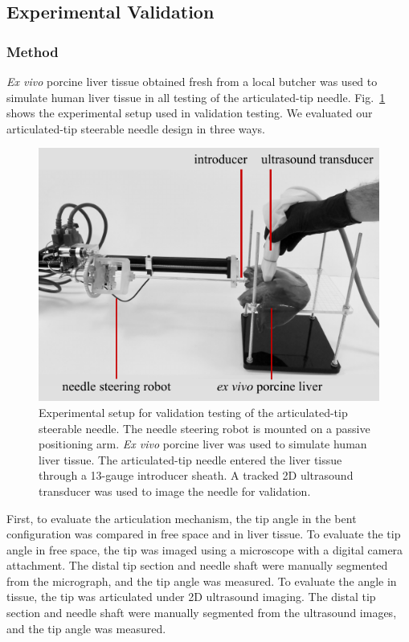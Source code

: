 \subsection{Experimental Validation}

\subsubsection{Method}
\textit{Ex vivo} porcine liver tissue obtained fresh from a local butcher was used to simulate human liver tissue in all testing of the articulated-tip needle. Fig.~\ref{fig:ExperimentalSetup} shows the experimental setup used in validation testing. We evaluated our articulated-tip steerable needle design in three ways. 

\begin{figure}[!t]
\centering
\includegraphics[width=0.75\columnwidth]{Images/Chapter3/ExperimentalSetup/ExperimentalSetup}
\caption[Setup for validation testing of the articulated-tip needle]{Experimental setup for validation testing of the articulated-tip steerable needle. The needle steering robot is mounted on a passive positioning arm. \textit{Ex vivo} porcine liver was used to simulate human liver tissue. The articulated-tip needle entered the liver tissue through a 13-gauge introducer sheath. A tracked 2D ultrasound transducer was used to image the needle for validation. }
\label{fig:ExperimentalSetup}
\end{figure} 

First, to evaluate the articulation mechanism, the tip angle in the bent configuration was compared in free space and in liver tissue. To evaluate the tip angle in free space, the tip was imaged using a microscope with a digital camera attachment. The distal tip section and needle shaft were manually segmented from the micrograph, and the tip angle was measured. To evaluate the angle in tissue, the tip was articulated under 2D ultrasound imaging. The distal tip section and needle shaft were manually segmented from the ultrasound images, and the tip angle was measured.

